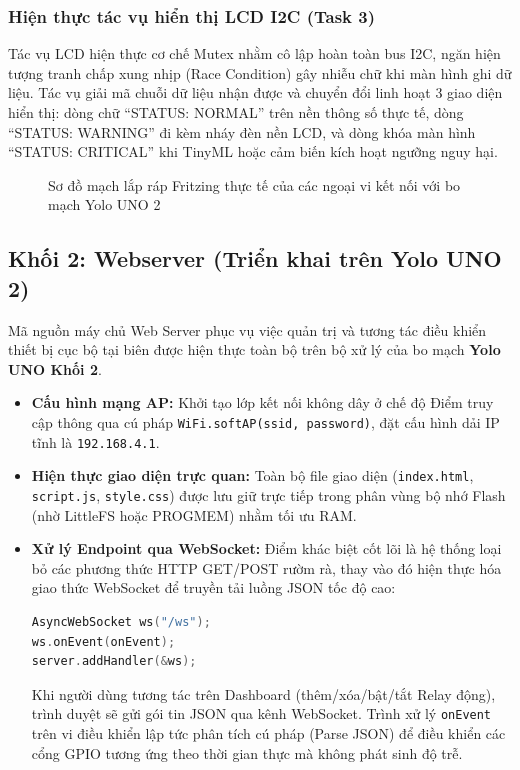 \subsubsection{Hiện thực tác vụ hiển thị LCD I2C (Task 3)}
Tác vụ LCD hiện thực cơ chế Mutex nhằm cô lập hoàn toàn bus I2C, ngăn hiện tượng tranh chấp xung nhịp (Race Condition) gây nhiễu chữ khi màn hình ghi dữ liệu. Tác vụ giải mã chuỗi dữ liệu nhận được và chuyển đổi linh hoạt 3 giao diện hiển thị: dòng chữ ``STATUS: NORMAL'' trên nền thông số thực tế, dòng ``STATUS: WARNING'' đi kèm nháy đèn nền LCD, và dòng khóa màn hình ``STATUS: CRITICAL'' khi TinyML hoặc cảm biến kích hoạt ngưỡng nguy hại.

\begin{figure}[H]
    \centering
    \caption{Sơ đồ mạch lắp ráp Fritzing thực tế của các ngoại vi kết nối với bo mạch Yolo UNO 2}
    \label{fig:fritzing_node2}
\end{figure}

\subsection{Khối 2: Webserver (Triển khai trên Yolo UNO 2)}
Mã nguồn máy chủ Web Server phục vụ việc quản trị và tương tác điều khiển thiết bị cục bộ tại biên được hiện thực toàn bộ trên bộ xử lý của bo mạch \textbf{Yolo UNO Khối 2}.
\begin{itemize}
    \item \textbf{Cấu hình mạng AP:} Khởi tạo lớp kết nối không dây ở chế độ Điểm truy cập thông qua cú pháp \texttt{WiFi.softAP(ssid, password)}, đặt cấu hình dải IP tĩnh là \texttt{192.168.4.1}.
    \item \textbf{Hiện thực giao diện trực quan:} Toàn bộ file giao diện (\texttt{index.html}, \texttt{script.js}, \texttt{style.css}) được lưu giữ trực tiếp trong phân vùng bộ nhớ Flash (nhờ LittleFS hoặc PROGMEM) nhằm tối ưu RAM.
    \item \textbf{Xử lý Endpoint qua WebSocket:} Điểm khác biệt cốt lõi là hệ thống loại bỏ các phương thức HTTP GET/POST rườm rà, thay vào đó hiện thực hóa giao thức WebSocket để truyền tải luồng JSON tốc độ cao:
\begin{lstlisting}[language=C++]
AsyncWebSocket ws("/ws");
ws.onEvent(onEvent);
server.addHandler(&ws);
\end{lstlisting}
Khi người dùng tương tác trên Dashboard (thêm/xóa/bật/tắt Relay động), trình duyệt sẽ gửi gói tin JSON qua kênh WebSocket. Trình xử lý \texttt{onEvent} trên vi điều khiển lập tức phân tích cú pháp (Parse JSON) để điều khiển các cổng GPIO tương ứng theo thời gian thực mà không phát sinh độ trễ.
\end{itemize}

